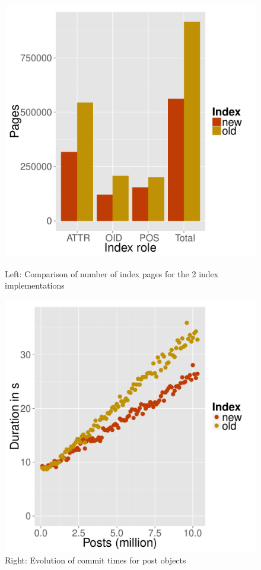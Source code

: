 \documentclass[11pt,a4paper,oneside]{article}
\begin{document}
\begin{figure}[h]
    \begin{minipage}{0.45\textwidth}
    \centering
	\includegraphics[scale=0.37]{images/SO_sizes.pdf} 	
	\caption{Left: Comparison of number of index pages for the 2 index implementations}
	\label{fig:so-sizes}
	\end{minipage}
	\hspace{0.5cm}
	\begin{minipage}{0.45\textwidth}
	\centering
	\includegraphics[scale=0.37]{images/SO_commit_duration.pdf} 
	\caption{Right: Evolution of commit times for post objects}
	\label{fig:so-commits}
	\end{minipage}
\end{figure}
\end{document}
